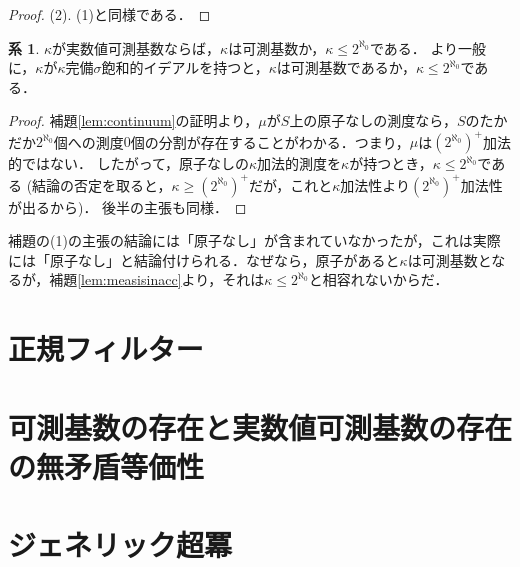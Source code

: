 \documentclass[uplatex]{jsarticle}
\theoremstyle{definition}
\newtheorem{cor}[thm]{系}
\begin{document}
\begin{proof}

		
		
		(2). (1)と同様である．
	\end{proof}
	
	\begin{cor}
		$\kappa$が実数値可測基数ならば，$\kappa$は可測基数か，$\kappa \le 2^{\aleph_0}$である．
		より一般に，$\kappa$が$\kappa$完備$\sigma$飽和的イデアルを持つと，$\kappa$は可測基数であるか，$\kappa \le 2^{\aleph_0}$である．
	\end{cor}
	\begin{proof}
		補題\ref{lem:continuum}の証明より，$\mu$が$S$上の原子なしの測度なら，$S$のたかだか$2^{\aleph_0}$個への測度$0$個の分割が存在することがわかる．つまり，$\mu$は$(2^{\aleph_0})^+$加法的ではない．
		したがって，原子なしの$\kappa$加法的測度を$\kappa$が持つとき，$\kappa \le 2^{\aleph_0}$である (結論の否定を取ると，$\kappa \ge (2^{\aleph_0})^+$だが，これと$\kappa$加法性より$(2^{\aleph_0})^+$加法性が出るから)．
		後半の主張も同様．
	\end{proof}

	補題\label{lem:continuum}の(1)の主張の結論には「原子なし」が含まれていなかったが，これは実際には「原子なし」と結論付けられる．なぜなら，原子があると$\kappa$は可測基数となるが，補題\ref{lem:measisinacc}より，それは$\kappa \le 2^{\aleph_0}$と相容れないからだ．
	
	
	\section{正規フィルター}
	
	\section{可測基数の存在と実数値可測基数の存在の無矛盾等価性}
	
	\section{ジェネリック超冪}
	
	\nocite{*}
	\printbibliography[title={参考文献}]
	
\end{document}
